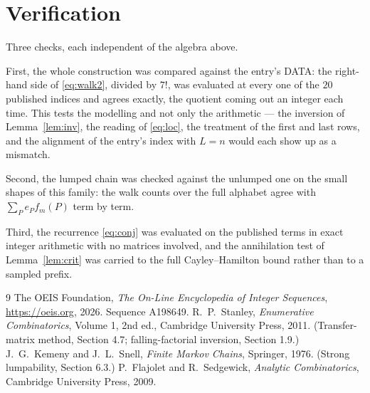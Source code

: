\documentclass[11pt,a4paper]{article}
\theoremstyle{plain}
\theoremstyle{definition}
\begin{document}
\section{Verification}

Three checks, each independent of the algebra above.

First, the whole construction was compared against the entry's DATA: the right-hand side of
\eqref{eq:walk2}, divided by $7!$, was evaluated at every one of the $20$
published indices and agrees exactly, the quotient coming out an integer each time. This
tests the modelling and not only the arithmetic --- the inversion of Lemma~\ref{lem:inv},
the reading of \eqref{eq:loc}, the treatment of the first and last rows, and the
alignment of the entry's index with $L=n$ would each show up as a mismatch.

Second, the lumped chain was checked against the unlumped one on the small shapes of this
family: the walk counts over the full alphabet agree with $\sum_P e_Pf_m(P)$ term by term.

Third, the recurrence \eqref{eq:conj} was evaluated on the published terms in exact integer
arithmetic with no matrices involved, and the annihilation test of Lemma~\ref{lem:crit} was
carried to the full Cayley--Hamilton bound rather than to a sampled prefix.

\begin{thebibliography}{9}
 The OEIS Foundation, \emph{The On-Line Encyclopedia of Integer
Sequences}, \url{https://oeis.org}, 2026. Sequence A198649.
 R.~P.~Stanley, \emph{Enumerative Combinatorics}, Volume 1, 2nd ed.,
Cambridge University Press, 2011. (Transfer-matrix method, Section 4.7; falling-factorial
inversion, Section 1.9.)
 J.~G.~Kemeny and J.~L.~Snell, \emph{Finite Markov Chains}, Springer,
1976. (Strong lumpability, Section 6.3.)
 P.~Flajolet and R.~Sedgewick, \emph{Analytic Combinatorics}, Cambridge
University Press, 2009.
\end{thebibliography}
\end{document}
